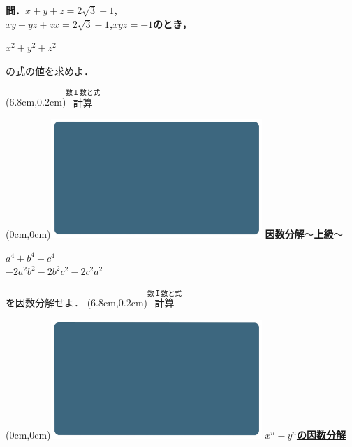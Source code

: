 \documentclass[10pt,
fleqn,
dvipdfmx,
uplatex
]{jsarticle}
\begin{document}
\normalsize
\bf\boldmath 問．$x+y+z=2\sqrt 3+1$,\;\\
\hfill $xy+yz+zx=2\sqrt 3-1$,\;$xyz=-1$のとき，

\HUGE 
\vspace{-0.2zw}
\hspace{0.5zw} $x^2+y^2+z^2$
\vspace{0.3zw}

\large
\hfill の式の値を求めよ．

\at(6.8cm,0.2cm){\small\color{bradorange}$\overset{\text{数Ｉ数と式}}{\text{計算}}$}


\newpage



\at(0cm,0cm){\includegraphics[width=8cm,bb=0 0 1920 1080]{./thumbnails/templates/smart_background/数I数と式.jpeg}}
{\color{orange}\bf\boldmath\huge\underline{因数分解$〜$上級$〜$}}\vspace{0.5zw}

\Large 
\bf\boldmath 

\LARGE
$a^4+b^4+c^4$\\
\hfill$-2a^2b^2-2b^2c^2-2c^2a^2$\vspace{0.5zw}

\Large
\hfill を因数分解せよ．
\at(6.8cm,0.2cm){\small\color{bradorange}$\overset{\text{数Ｉ数と式}}{\text{計算}}$}


\newpage



\at(0cm,0cm){\includegraphics[width=8cm,bb=0 0 1920 1080]{./thumbnails/templates/smart_background/数I数と式.jpeg}}
{\color{orange}\bf\boldmath\huge\underline{$x^n-y^n$の因数分解}}\vspace{0.3zw}
\end{document}
